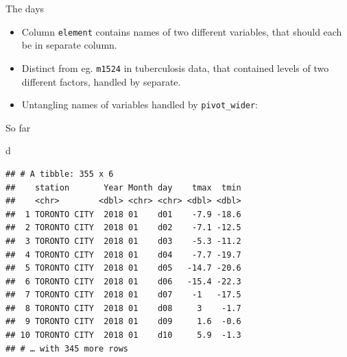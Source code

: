 \documentclass[
  ignorenonframetext,
]{beamer}
\newenvironment{Shaded}{\begin{snugshade}}{\end{snugshade}}
\newcommand{\DataTypeTok}[1]{\textcolor[rgb]{0.13,0.29,0.53}{#1}}
\newcommand{\KeywordTok}[1]{\textcolor[rgb]{0.13,0.29,0.53}{\textbf{#1}}}
\newcommand{\NormalTok}[1]{#1}
\newcommand{\OperatorTok}[1]{\textcolor[rgb]{0.81,0.36,0.00}{\textbf{#1}}}
\newcommand{\StringTok}[1]{\textcolor[rgb]{0.31,0.60,0.02}{#1}}
\providecommand{\tightlist}{%
  \setlength{\itemsep}{0pt}\setlength{\parskip}{0pt}}
\begin{document}
\begin{frame}[fragile]{The days}
\protect\hypertarget{the-days}{}

\begin{itemize}
\tightlist
\item
  Column \texttt{element} contains names of two different variables,
  that should each be in separate column.
\item
  Distinct from eg. \texttt{m1524} in tuberculosis data, that contained
  levels of two different factors, handled by separate.
\item
  Untangling names of variables handled by \texttt{pivot\_wider}:
\end{itemize}

\begin{Shaded}
\end{Shaded}

\end{frame}

\begin{frame}[fragile]{So far}
\protect\hypertarget{so-far-1}{}

\begin{Shaded}
\begin{Highlighting}[]
\NormalTok{d}
\end{Highlighting}
\end{Shaded}

\begin{verbatim}
## # A tibble: 355 x 6
##    station       Year Month day    tmax  tmin
##    <chr>        <dbl> <chr> <chr> <dbl> <dbl>
##  1 TORONTO CITY  2018 01    d01    -7.9 -18.6
##  2 TORONTO CITY  2018 01    d02    -7.1 -12.5
##  3 TORONTO CITY  2018 01    d03    -5.3 -11.2
##  4 TORONTO CITY  2018 01    d04    -7.7 -19.7
##  5 TORONTO CITY  2018 01    d05   -14.7 -20.6
##  6 TORONTO CITY  2018 01    d06   -15.4 -22.3
##  7 TORONTO CITY  2018 01    d07    -1   -17.5
##  8 TORONTO CITY  2018 01    d08     3    -1.7
##  9 TORONTO CITY  2018 01    d09     1.6  -0.6
## 10 TORONTO CITY  2018 01    d10     5.9  -1.3
## # … with 345 more rows
\end{verbatim}

\end{frame}
\end{document}
